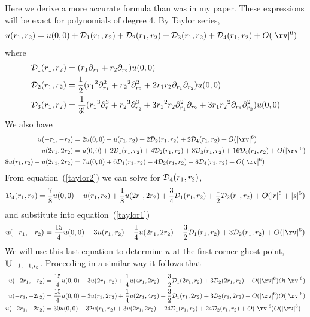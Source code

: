 \documentclass[12pt]{article}
\begin{document}
\newcommand{\ra}{{r_1}}
\newcommand{\rb}{{r_2}}
\newcommand{\rc}{{r_3}}
\newcommand{\trunc}{O(|\rv|^6)}
Here we derive a more accurate formula than was in my paper. These expressions will be 
exact for polynomials of degree 4. 
By Taylor series,
\begin{align*}
  u(\ra,\rb)&= u(0,0) + \Ds_1(\ra,\rb) + \Ds_2(\ra,\rb) + \Ds_3(\ra,\rb) + \Ds_4(\ra,\rb) + \trunc
\end{align*}
where
\begin{align*}
  \Ds_1(\ra,\rb) &= (\ra \partial_\ra + \rb \partial_\rb ) u(0,0) \\
  \Ds_2(\ra,\rb) &= {1\over2}( \ra^2\partial_\ra^2+\rb^2\partial_\rb^2+ 2\ra\rb\partial_\ra\partial_\rb  )u(0,0)  \\
  \Ds_3(\ra,\rb) &= {1\over3!}( \ra^3\partial_r^3 + \rb^3\partial_\rb^3 
                   +3\ra^2\rb\partial_\ra^2\partial_\rb + 3\ra\rb^2\partial_\ra\partial_\rb^2  )u(0,0)  
\end{align*}
We also have 
\begin{align}
 u(-\ra,-\rb) &= 2 u(0,0) - u(\ra,\rb) + 2\Ds_2(\ra,\rb) + 2\Ds_4(\ra,\rb)+ \trunc \label{taylor1} \\
  u(2\ra,2\rb)&= u(0,0) + 2\Ds_1(\ra,\rb) + 4\Ds_2(\ra,\rb) + 8\Ds_3(\ra,\rb) + 16\Ds_4(\ra,\rb) + \trunc\\
 8 u(\ra,\rb) - u(2\ra,2\rb) &= 7u(0,0) + 6\Ds_1(\ra,\rb) + 4 \Ds_2(\ra,\rb) -8 \Ds_4(\ra,\rb) + \trunc \label{taylor2} 
\end{align}
From equation~(\ref{taylor2}) we can solve for $\Ds_4(\ra,\rb)$,
\[
  \Ds_4(\ra,\rb) = {7\over8}u(0,0) - u(\ra,\rb) + {1\over 8}u(2\ra,2\rb) + {3\over4}\Ds_1(\ra,\rb) + {1\over2} \Ds_2(\ra,\rb)
                             + O(|r|^5+|s|^5)
\]
and substitute into equation~(\ref{taylor1}) 
\begin{equation}
  u(-\ra,-\rb) = {15\over4} u(0,0) - 3 u(\ra,\rb) + {1\over 4}u(2\ra,2\rb) + {3\over2}\Ds_1(\ra,\rb) 
                          + 3\Ds_2(\ra,\rb) +  \trunc \label{eq:corner1}
\end{equation}
We will use this last equation to determine $u$ at the first corner ghost point, $\mathbf{U}_{-1,-1,i_3}$.
Proceeding in a similar way it follows that
\begin{align}
 u(-2\ra,-\rb) &= {15\over4} u(0,0) - 3 u(2\ra,\rb) + {1\over 4}u(4\ra,2\rb) + {3\over2}\Ds_1(2\ra,\rb) 
                          + 3\Ds_2(2\ra,\rb) +  \trunc \trunc \label{eq:corner2}\\
 u(-\ra,-2\rb) &= {15\over4} u(0,0) - 3 u(\ra,2\rb) + {1\over 4}u(2\ra,4\rb) + {3\over2}\Ds_1(\ra,2\rb) 
                          + 3\Ds_2(\ra,2\rb) +  \trunc \trunc \label{eq:corner3}\\
 u(-2\ra,-2\rb) &=30 u(0,0) -32 u(\ra,\rb) + 3u(2\ra,2\rb) + 24 \Ds_1(\ra,\rb) + 24 \Ds_2(\ra,\rb) +  \trunc\trunc \label{eq:corner4}
\end{align}
\end{document}
